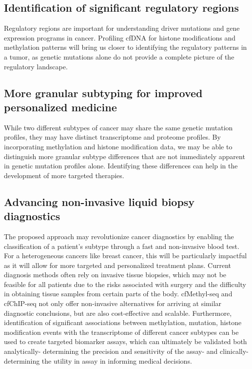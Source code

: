 \documentclass[11pt]{article}
\begin{document}
\subsection*{Identification of significant regulatory regions} Regulatory regions are 
important for understanding driver mutations and gene expression programs in cancer.
Profiling cfDNA for histone modifications and methylation patterns will bring us 
closer to identifying the regulatory patterns in a tumor, as genetic mutations alone
do not provide a complete picture of the regulatory landscape. 
\subsection*{More granular subtyping for improved personalized medicine}
While two different subtypes of cancer may share the same genetic mutation profiles,
they may have distinct transcriptome and proteome profiles.
By incorporating methylation and histone modification data, we may be able to
distinguish more granular subtype differences that are not immediately apparent
in genetic mutation profiles alone. 
Identifying these differences can help in the development of more targeted therapies.
\subsection*{Advancing non-invasive liquid biopsy diagnostics} 
The proposed approach may revolutionize cancer diagnostics by enabling the
classification of a patient's subtype through a fast and non-invasive blood test.
For a heterogeneous cancers like breast cancer, this will be particularly impactful
as it will allow for more targeted and personalized treatment plans. 
Current diagnosis methods often rely on invasive tissue biopsies, 
which may not be feasible for all patients due to the risks associated with
surgery and the difficulty in obtaining tissue samples from certain parts of the body.
cfMethyl-seq and cfChIP-seq not only offer non-invasive alternatives for arriving
at similar diagnostic conclusions, but are also cost-effective and scalable.
Furthermore, identification of significant associations between methylation, mutation, histone modification events with the transcriptome of different cancer subtypes can be used to create targeted biomarker assays, which can ultimately be validated both analytically- determining the precision and sensitivity of the assay- and clinically- determining the utility in assay in informing medical decisions.
\end{document}
